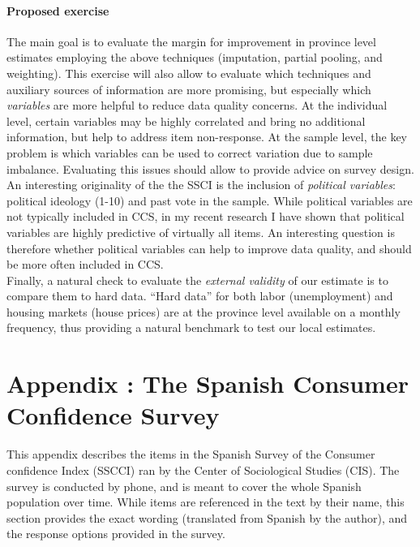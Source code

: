 \documentclass[12pt]{article}
\begin{document}
\paragraph{Proposed exercise}

The main goal is to evaluate the margin for improvement in province level estimates employing the above techniques (imputation, partial pooling, and weighting). This exercise will also allow to evaluate which techniques and auxiliary sources of information are more promising,  but especially which \emph{variables} are more helpful to reduce data quality concerns. At the individual level, certain variables may be highly correlated and bring no additional information, but help to address item non-response. At the sample level, the key problem is which variables can be used to correct variation due to sample imbalance. Evaluating this issues should allow to provide advice on survey design. 
\\

An interesting originality of the the SSCI is the inclusion of \emph{political variables}: political ideology (1-10) and past vote in the sample. While political variables are not typically included in CCS, in my recent research I have shown that political variables are highly predictive of virtually all items. An interesting question is therefore whether political variables can help to improve data quality, and should be more often included in CCS.
\\

Finally, a natural check  to evaluate the \emph{external validity} of our estimate is to compare them to hard data. ``Hard data'' for both labor (unemployment) and housing markets (house prices) are at the province level available on a monthly frequency, thus providing a natural benchmark to test our local estimates. 



\pagebreak 



\section*{Appendix : The Spanish Consumer Confidence Survey} \label{app_items}

This appendix describes the items in the Spanish Survey of the Consumer confidence Index (SSCCI) ran by the Center of Sociological Studies (CIS). The survey is conducted by phone, and is meant to cover the whole Spanish population over time. While items are referenced in the text by their name, this section provides the exact wording (translated from Spanish by the author), and the response options provided in the survey. 
\end{document}
